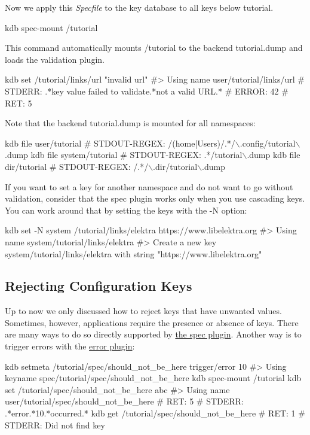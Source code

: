 Now we apply this {\itshape Specfile} to the key database to all keys below {\ttfamily tutorial}. 
\begin{DoxyCode}
kdb spec-mount /tutorial
\end{DoxyCode}
 This command automatically mounts {\ttfamily /tutorial} to the backend {\ttfamily tutorial.\+dump} and loads the validation plugin.


\begin{DoxyCode}
kdb set /tutorial/links/url "invalid url"
#> Using name user/tutorial/links/url
# STDERR: .*key value failed to validate.*not a valid URL.*
# ERROR:  42
# RET:    5
\end{DoxyCode}


Note that the backend {\ttfamily tutorial.\+dump} is mounted for all namespaces\+: 
\begin{DoxyCode}
kdb file user/tutorial
# STDOUT-REGEX: /(home|Users)/.*/\(\backslash\).config/tutorial\(\backslash\).dump
kdb file system/tutorial
# STDOUT-REGEX: .*/tutorial\(\backslash\).dump
kdb file dir/tutorial
# STDOUT-REGEX: /.*/\(\backslash\).dir/tutorial\(\backslash\).dump
\end{DoxyCode}


If you want to set a key for another namespace and do not want to go without validation, consider that the spec plugin works only when you use cascading keys. You can work around that by setting the keys with the {\ttfamily -\/N} option\+: 
\begin{DoxyCode}
kdb set -N system /tutorial/links/elektra https://www.libelektra.org
#> Using name system/tutorial/links/elektra
#> Create a new key system/tutorial/links/elektra with string "https://www.libelektra.org"
\end{DoxyCode}


\subsection*{Rejecting Configuration Keys}

Up to now we only discussed how to reject keys that have unwanted values. Sometimes, however, applications require the presence or absence of keys. There are many ways to do so directly supported by \hyperlink{md_src_plugins_spec_README_src_plugins_spec_README_md}{the spec plugin}. Another way is to trigger errors with the \hyperlink{md_src_plugins_error_README_src_plugins_error_README_md}{error plugin}\+:


\begin{DoxyCode}
kdb setmeta /tutorial/spec/should\_not\_be\_here trigger/error 10
#> Using keyname spec/tutorial/spec/should\_not\_be\_here
kdb spec-mount /tutorial
kdb set /tutorial/spec/should\_not\_be\_here abc
#> Using name user/tutorial/spec/should\_not\_be\_here
# RET:    5
# STDERR: .*error.*10.*occurred.*
kdb get /tutorial/spec/should\_not\_be\_here
# RET: 1
# STDERR: Did not find key
\end{DoxyCode}


